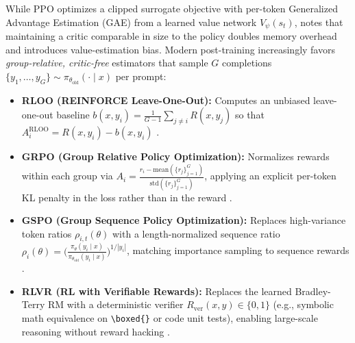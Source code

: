 \documentclass[../../../../master.tex]{subfiles}
\begin{document}
While PPO optimizes a clipped surrogate objective with per-token Generalized Advantage Estimation (GAE) from a learned value network $V_\psi(s_t)$,  notes that maintaining a critic comparable in size to the policy doubles memory overhead and introduces value-estimation bias. Modern post-training increasingly favors \emph{group-relative, critic-free} estimators that sample $G$ completions $\{y_1, \dots, y_G\} \sim \pi_{\theta_{\mathrm{old}}}(\cdot \mid x)$ per prompt:
\begin{sloppypar}
\begin{itemize}
\item \textbf{RLOO (REINFORCE Leave-One-Out):} Computes an unbiased leave-one-out baseline $b(x, y_i) = \frac{1}{G-1}\sum_{j \neq i} R(x, y_j)$ so that $A_i^{\mathrm{RLOO}} = R(x, y_i) - b(x, y_i)$ .
\item \textbf{GRPO (Group Relative Policy Optimization):} Normalizes rewards within each group via $A_i = \frac{r_i - \mathrm{mean}(\{r_j\}_{j=1}^G)}{\mathrm{std}(\{r_j\}_{j=1}^G)}$, applying an explicit per-token KL penalty in the loss rather than in the reward  .
\item \textbf{GSPO (Group Sequence Policy Optimization):} Replaces high-variance token ratios $\rho_{i,t}(\theta)$ with a length-normalized sequence ratio $\rho_i(\theta) = \big(\frac{\pi_\theta(y_i \mid x)}{\pi_{\theta_{\mathrm{old}}}(y_i \mid x)}\big)^{1/|y_i|}$, matching importance sampling to sequence rewards .
\item \textbf{RLVR (RL with Verifiable Rewards):} Replaces the learned Bradley-Terry RM with a deterministic verifier $R_{\mathrm{ver}}(x,y) \in \{0, 1\}$ (e.g., symbolic math equivalence on \verb|\boxed{}| or code unit tests), enabling large-scale reasoning without reward hacking  .
\end{itemize}
\end{sloppypar}

\end{document}
